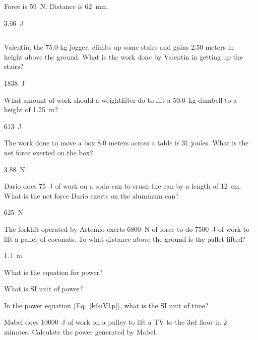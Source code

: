 \documentclass[]{exam}
\begin{document}
\begin{questions}
\question \label{KU49Fc}
Force is \SI{59}{N}. Distance is \SI{62}{mm}.

\begin{solution}
\SI{3.66}{J}
\end{solution}

\bigskip

\hrule


\question \label{VMEVDL}
Valent\'{i}n, the 75.0-kg jogger, climbs up some stairs and gains 2.50 meters in height above the ground. What is the work done by Valent\'{i}n in getting up the stairs? 

\begin{solution}
\SI{1838}{J}
\end{solution}


\question \label{OgbvKL}
What amount of work should a weightlifter do to lift a \SI{50.0}{kg} dumbell to a height of \SI{1.25}{m}?

\begin{solution}
\SI{613}{J}
\end{solution}

\question \label{T8C3X0}
The work done to move a box 8.0 meters across a table is 31 joules. What is the net force exerted on the box?

\begin{solution}
\SI{3.88}{N}
\end{solution}

\question \label{7BKGsL}
Dario does \SI{75}{J} of work on a soda can to crush the can by a length of \SI{12}{cm}. What is the net force Dario exerts on the aluminum can?

\begin{solution}
\SI{625}{N}
\end{solution}


\question \label{sRogOc}
The forklift operated by Artemio exerts \SI{6800}{N} of force to do \SI{7500}{J} of work to lift a pallet of coconuts. To what distance above the ground is the pallet lifted? 

\begin{solution}
\SI{1.1}{m}
\end{solution}



\question \label{AlYFHO}
What is the equation for power?


\question
What is SI unit of power?


\question
In the power equation (Eq.~\ref{k6uV1p}), what is the SI unit of time?


\question \label{i4fTLq}
Mabel does \SI{10000}{J} of work on a pulley to lift a TV to the 3rd floor in 2 minutes. Calculate the power generated by Mabel.


\end{questions}
\end{document}
